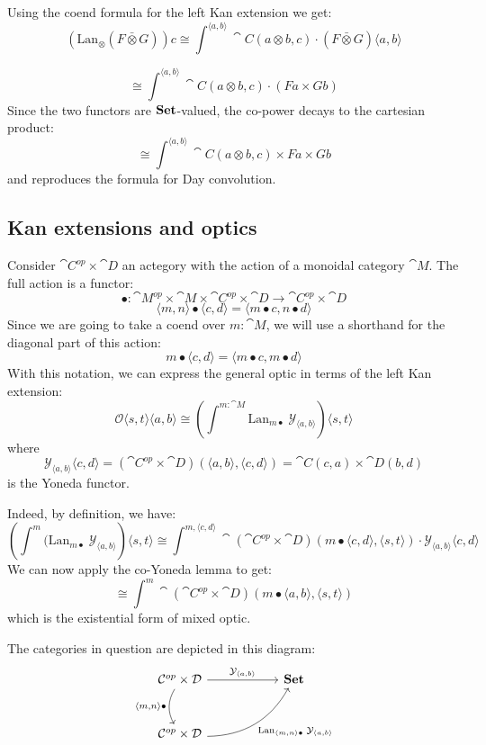 \documentclass[DaoFP]{subfiles}
\begin{document}
Using the coend formula for the left Kan extension we get:
\[ (\text{Lan}_{\otimes} (F \bar{ \otimes } G)) c \cong \int^{\langle a, b\rangle} \cat C ( a \otimes b, c) \cdot (F \bar{ \otimes } G)\langle a, b\rangle\]

\[ \cong \int^{\langle a, b\rangle} \cat C ( a \otimes b, c) \cdot (F a \times G  b) \]
Since the two functors are $\mathbf{Set}$-valued, the co-power decays to the cartesian product:
\[ \cong \int^{\langle a, b\rangle} \cat C ( a \otimes b, c) \times F a \times G  b \]
and reproduces the formula for Day convolution.

\subsection{Kan extensions and optics}

Consider $\cat C^{op} \times \cat D$ an actegory with the action of a monoidal category $\cat M$. The full action is a functor:
\[ \bullet \colon \cat M^{op} \times \cat M \times \cat C^{op} \times \cat D \to  \cat C^{op} \times \cat D \]
\[  \langle m, n  \rangle \bullet \langle c, d \rangle = \langle m \bullet c, n \bullet d \rangle \]
Since we are going to take a coend over $m \colon \cat M$, we will use a shorthand for the diagonal part of this action:
\[ m \bullet \langle c, d \rangle = \langle m \bullet c, m \bullet d \rangle \]
With this notation, we can express the general optic in terms of the left Kan extension:
\[ \mathcal{O} \langle s, t \rangle \langle a, b \rangle \cong \left(\int^{m \colon \cat M} \text{Lan}_{m \bullet} \;\mathcal Y_{\langle a, b \rangle}\right) \langle s, t \rangle \]
where
\[ \mathcal Y_{\langle a, b \rangle} \langle c, d \rangle = (\cat C^{op} \times \cat D)(\langle a, b \rangle, \langle c, d \rangle) = \cat C(c, a) \times \cat D(b, d) \]
is the Yoneda functor.

Indeed, by definition, we have:
\[ \left( \int^m (\text{Lan}_{m \bullet} \; \mathcal Y_{\langle a, b \rangle} \right) \langle s, t \rangle \cong 
\int^{m, \langle c, d \rangle} \cat (\cat C^{op} \times \cat D)(m \bullet \langle c, d \rangle, \langle s, t \rangle) \cdot \mathcal Y_{\langle a, b \rangle} \langle c, d \rangle \]
We can now apply the co-Yoneda lemma to get:
\[ \cong \int^m \cat (\cat C^{op} \times \cat D)(m \bullet \langle a, b \rangle, \langle s, t \rangle)\]
which is the existential form of mixed optic.

The categories in question are depicted in this diagram:
\[
 \begin{tikzcd} [row sep=1cm, column sep=1cm]
 \cat C^{op} \times \cat D
 \arrow[rr, "\mathcal Y_{\langle a, b \rangle}", "" {name=ID, below} ]
 \arrow[d, bend right, "{\langle m, n \rangle \bullet}"']
 && \Set
 \\
 \cat C^{op} \times \cat D
  \arrow[urr, bend right, "{\text{Lan}_{\langle m, n \rangle \bullet}\; \mathcal Y_{\langle a, b \rangle}}"']
 \end{tikzcd}
\]
\end{document}
